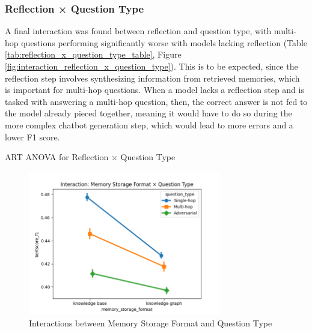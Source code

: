\subsubsection{Reflection × Question Type}

A final interaction was found between reflection and question type, with multi-hop questions performing significantly worse with models lacking reflection (Table \ref{tab:reflection_x_question_type_table}, Figure \ref{fig:interaction_reflection_x_question_type}). This is to be expected, since the reflection step involves synthesizing information from retrieved memories, which is important for multi-hop questions. When a model lacks a reflection step and is tasked with answering a multi-hop question, then, the correct answer is not fed to the model already pieced together, meaning it would have to do so during the more complex chatbot generation step, which would lead to more errors and a lower F1 score.

\begin{table}[htbp]
\centering
\tiny

\caption{ART ANOVA for Reflection × Question Type}
\label{tab:reflection_x_question_type_table}
\end{table}


\begin{figure}[htbp]
\centering
\includegraphics[width=0.75\textwidth]{charts/interaction_memory_storage_format_x_question_type.png}
\caption{Interactions between Memory Storage Format and Question Type}
\label{fig:interaction_memory_storage_format_x_question_type}
\end{figure}

